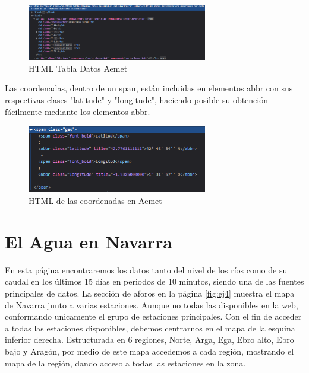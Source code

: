 \begin{figure} [H]
	\centering
	\includegraphics[width=0.7\textwidth]{fig/AemetDataHTML.png}
	\caption[HTML de la tabla de datos de Aemet de la estación en Aranguren (Navarra)]{HTML Tabla Datos Aemet}
	\label{fig:ej20}
\end{figure}

Las coordenadas, dentro de un span, están incluidas en elementos abbr con sus respectivas clases "latitude" y "longitude", haciendo posible su obtención fácilmente mediante los elementos abbr.

\begin{figure} [H]
	\centering
	\includegraphics[width=0.7\textwidth]{fig/AemetCoordHTML.png}
	\caption[HTML de las coordenadas de Aemet de la estación en Aranguren (Navarra)]{HTML de las coordenadas en Aemet}
	\label{fig:ej21}
\end{figure}

\section{El Agua en Navarra}
En esta página encontraremos los datos tanto del nivel de los ríos como de su caudal en los últimos 15 días en periodos de 10 minutos, siendo una de las fuentes principales de datos.
\newline
\newline
La sección de aforos en la página \ref{fig:ej4} muestra el mapa de Navarra junto a varias estaciones. Aunque no todas las disponibles en la web, conformando unicamente el grupo de estaciones principales.\newline
\newline
Con el fin de acceder a todas las estaciones disponibles, debemos centrarnos en el mapa de la esquina inferior derecha. Estructurada en 6 regiones, Norte, Arga, Ega, Ebro alto, Ebro bajo y Aragón, por medio de este mapa accedemos a cada región, mostrando el mapa de la región, dando acceso a todas las estaciones en la zona.


